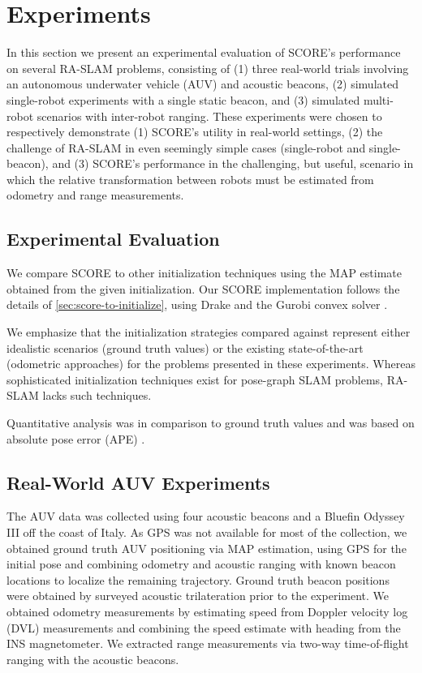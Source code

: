 \section{Experiments}
\label{sec:experiments}



In this section we present an experimental evaluation of SCORE's performance on
several RA-SLAM problems, consisting of (1) three real-world trials
involving an autonomous underwater vehicle (AUV) and acoustic beacons, (2)
simulated single-robot experiments with a single static beacon, and (3)
simulated multi-robot scenarios with inter-robot ranging. These experiments were
chosen to
respectively demonstrate (1)
SCORE's utility in real-world settings, (2) the challenge of RA-SLAM in even
seemingly simple cases (single-robot and single-beacon), and (3) SCORE's
performance in the challenging, but useful, scenario in which the relative
transformation between robots must be estimated from odometry and range
measurements.

\subsection{Experimental Evaluation}
\label{sec:experimental-eval}

We compare SCORE to other initialization techniques using the MAP estimate
obtained from the given initialization. Our SCORE implementation follows the
details of \cref{sec:score-to-initialize}, using Drake \cite{drake} and the
Gurobi convex solver \cite{gurobi}.

We emphasize that the initialization strategies compared against represent
either idealistic scenarios (ground truth values) or the existing
state-of-the-art (odometric approaches) for the problems presented in these
experiments. Whereas sophisticated initialization techniques exist for
pose-graph SLAM problems, RA-SLAM lacks such techniques.

Quantitative analysis was in comparison to ground truth values and was based on
absolute pose error (APE) \cite{grupp2017evo}.

\subsection{Real-World AUV Experiments}

The AUV data was collected using four acoustic beacons and a Bluefin Odyssey III
off the coast of Italy.  As GPS was not available for most of the collection, we
obtained ground truth AUV positioning via MAP estimation, using GPS for the
initial pose and combining odometry and acoustic ranging with known beacon
locations to localize the remaining trajectory. Ground truth beacon positions
were obtained by surveyed acoustic trilateration prior to the experiment. We
obtained odometry measurements by estimating speed from Doppler velocity log
(DVL) measurements and combining the speed estimate with heading from the INS
magnetometer. We extracted range measurements via two-way time-of-flight ranging
with the acoustic beacons.

